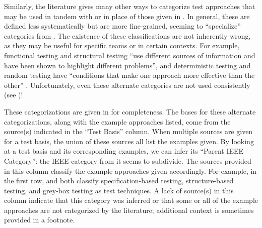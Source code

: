     Similarly, the literature gives many other ways to categorize test
    approaches that may be used in tandem with or in place of those given in
    . In general, these are defined less
    systematically but are more fine-grained, seeming to ``specialize''
    categories from . The existence of these classifications
    are not inherently wrong, as they may be useful for specific teams or in
    certain contexts. For example, functional testing and structural testing
    ``use different sources of information and have been shown to highlight
    different problems'', and deterministic testing and random testing have
    ``conditions that make one approach more effective than the other''
    \citep[p.~5\=/16]{SWEBOK2024}. Unfortunately, even these alternate
    categories are not used consistently (see )!

    These categorizations are given in  for
    completeness. The bases for these alternate categorizations, along with the
    example approaches listed, come from the source(s) indicated in the ``Test
    Basis'' column. When multiple sources are given for a test basis, the union
    of these sources all list the examples given. By looking at a test basis
    and its corresponding examples, we can infer its ``Parent IEEE Category'':
    the IEEE category from  it seems to subdivide. The
    sources provided in this column classify the example approaches given
    accordingly. For example, in the first row, \citet[pp.~4, 8]{IEEE2021} and
    \citet[p.~46]{Firesmith2015} both classify specification-based testing,
    structure-based testing, and grey-box testing as test techniques. A lack of
    source(s) in this column indicate that this category was inferred or that
    some or all of the example approaches are not categorized by the
    literature; additional context is sometimes provided in a footnote.

    \afterpage{
        \begin{landscape}
            \otherCategorizationsTable{}
        \end{landscape}
    }

